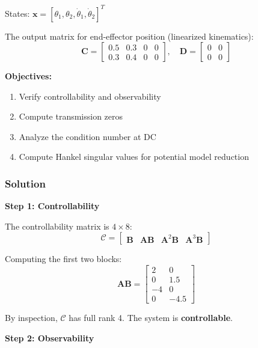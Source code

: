States: $\mathbf{x} = [\theta_1, \theta_2, \dot{\theta}_1, \dot{\theta}_2]^T$

The output matrix for end-effector position (linearized kinematics):
\begin{equation}
\mathbf{C} = \begin{bmatrix} 0.5 & 0.3 & 0 & 0 \\ 0.3 & 0.4 & 0 & 0 \end{bmatrix}, \quad
\mathbf{D} = \begin{bmatrix} 0 & 0 \\ 0 & 0 \end{bmatrix}
\end{equation}

\textbf{Objectives:}
\begin{enumerate}
\item Verify controllability and observability
\item Compute transmission zeros
\item Analyze the condition number at DC
\item Compute Hankel singular values for potential model reduction
\end{enumerate}

\subsubsection{Solution}

\textbf{Step 1: Controllability}

The controllability matrix is $4 \times 8$:
\begin{equation}
\mathcal{C} = \begin{bmatrix} \mathbf{B} & \mathbf{A}\mathbf{B} & \mathbf{A}^2\mathbf{B} & \mathbf{A}^3\mathbf{B} \end{bmatrix}
\end{equation}

Computing the first two blocks:
\begin{equation}
\mathbf{A}\mathbf{B} = \begin{bmatrix} 2 & 0 \\ 0 & 1.5 \\ -4 & 0 \\ 0 & -4.5 \end{bmatrix}
\end{equation}

By inspection, $\mathcal{C}$ has full rank 4. The system is \textbf{controllable}.

\textbf{Step 2: Observability}

